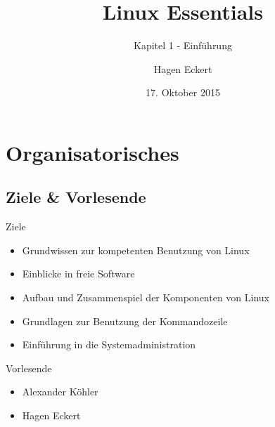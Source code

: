 \documentclass[aspectratio=43]{beamer}
\title[Linux Essentials  - Kapitel 1 - Einführung]{Linux Essentials}
\subtitle{Kapitel 1 - Einführung}
\author{Hagen Eckert}
\date{17. Oktober 2015}
\begin{document}
\logoframe

\frame{\titlepage}

\setcounter{tocdepth}{1}
\section[Gliederung]{}
\frame{\tableofcontents}


\section{Organisatorisches}
\subsection{Ziele \& Vorlesende}
\begin{frame} 

	\begin{block}{Ziele} 
	\begin{itemize}
	\item Grundwissen zur kompetenten Benutzung von Linux
	\item Einblicke in freie Software
	\item Aufbau und Zusammenspiel der Komponenten von Linux
	\item Grundlagen zur Benutzung der Kommandozeile
	\item Einführung in die Systemadministration
	\end{itemize}
	\end{block}
	
	\begin{block}{Vorlesende} 
	\begin{itemize}
	\item Alexander Köhler
	\item Hagen Eckert
	\end{itemize}
	\end{block}

\end{frame}
\end{document}
